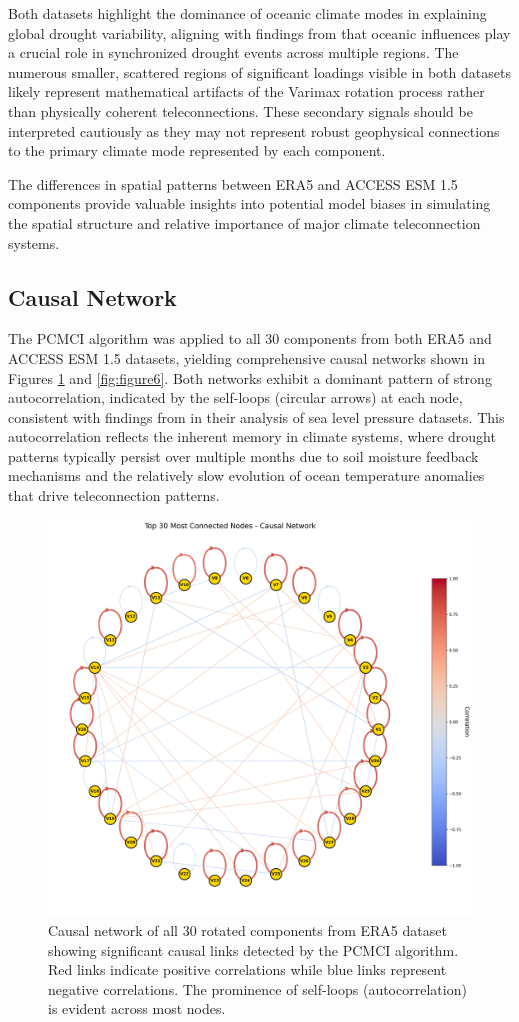 \documentclass[
]{krantz}
\begin{document}
Both datasets highlight the dominance of oceanic climate modes in explaining global drought variability, aligning with findings from \citet{chauhan2024} that oceanic influences play a crucial role in synchronized drought events across multiple regions. The numerous smaller, scattered regions of significant loadings visible in both datasets likely represent mathematical artifacts of the Varimax rotation process rather than physically coherent teleconnections. These secondary signals should be interpreted cautiously as they may not represent robust geophysical connections to the primary climate mode represented by each component.

The differences in spatial patterns between ERA5 and ACCESS ESM 1.5 components provide valuable insights into potential model biases in simulating the spatial structure and relative importance of major climate teleconnection systems.

\subsection{Causal Network}\label{causal-network}

The PCMCI algorithm was applied to all 30 components from both ERA5 and ACCESS ESM 1.5 datasets, yielding comprehensive causal networks shown in Figures \ref{fig:figure5} and \ref{fig:figure6}. Both networks exhibit a dominant pattern of strong autocorrelation, indicated by the self-loops (circular arrows) at each node, consistent with findings from \citet{nowack2020} in their analysis of sea level pressure datasets. This autocorrelation reflects the inherent memory in climate systems, where drought patterns typically persist over multiple months due to soil moisture feedback mechanisms and the relatively slow evolution of ocean temperature anomalies that drive teleconnection patterns.

\begin{figure}

{\centering \includegraphics[width=0.49\linewidth]{work/02-causaldisc/figures/ERA5/enhanced_causal_network_era5} 

}

\caption{Causal network of all 30 rotated components from ERA5 dataset showing significant causal links detected by the PCMCI algorithm. Red links indicate positive correlations while blue links represent negative correlations. The prominence of self-loops (autocorrelation) is evident across most nodes.}\label{fig:figure5}
\end{figure}
\end{document}
